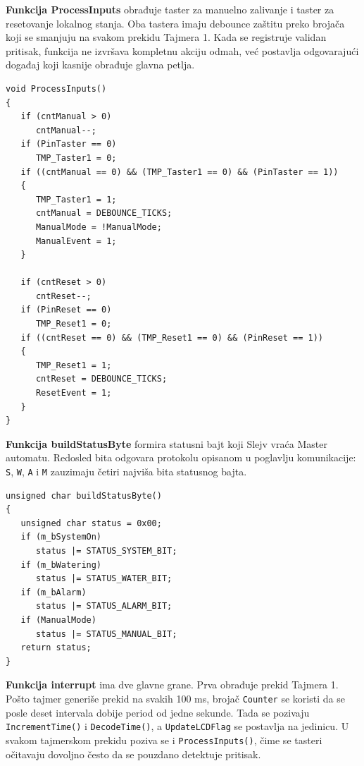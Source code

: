 \documentclass[12pt]{article}
\numberwithin{figure}{section}
\begin{document}
  \textbf{Funkcija ProcessInputs} obrađuje taster za manuelno zalivanje i taster za resetovanje lokalnog stanja.
  Oba tastera imaju debounce zaštitu preko brojača koji se smanjuju na svakom prekidu Tajmera 1.
  Kada se registruje validan pritisak, funkcija ne izvršava kompletnu akciju odmah, već postavlja odgovarajući događaj koji kasnije obrađuje glavna petlja.
  \begin{verbatim}
void ProcessInputs()
{
   if (cntManual > 0)
      cntManual--;
   if (PinTaster == 0)
      TMP_Taster1 = 0;
   if ((cntManual == 0) && (TMP_Taster1 == 0) && (PinTaster == 1))
   {
      TMP_Taster1 = 1;
      cntManual = DEBOUNCE_TICKS;
      ManualMode = !ManualMode;
      ManualEvent = 1;
   }

   if (cntReset > 0)
      cntReset--;
   if (PinReset == 0)
      TMP_Reset1 = 0;
   if ((cntReset == 0) && (TMP_Reset1 == 0) && (PinReset == 1))
   {
      TMP_Reset1 = 1;
      cntReset = DEBOUNCE_TICKS;
      ResetEvent = 1;
   }
}
  \end{verbatim}

  \textbf{Funkcija buildStatusByte} formira statusni bajt koji Slejv vraća Master automatu.
  Redosled bita odgovara protokolu opisanom u poglavlju komunikacije: \texttt{S}, \texttt{W}, \texttt{A} i \texttt{M} zauzimaju četiri najviša bita statusnog bajta.
  \begin{verbatim}
unsigned char buildStatusByte()
{
   unsigned char status = 0x00;
   if (m_bSystemOn)
      status |= STATUS_SYSTEM_BIT;
   if (m_bWatering)
      status |= STATUS_WATER_BIT;
   if (m_bAlarm)
      status |= STATUS_ALARM_BIT;
   if (ManualMode)
      status |= STATUS_MANUAL_BIT;
   return status;
}
  \end{verbatim}

  \textbf{Funkcija interrupt} ima dve glavne grane.
  Prva obrađuje prekid Tajmera 1.
  Pošto tajmer generiše prekid na svakih 100 ms, brojač \texttt{Counter} se koristi da se posle deset intervala dobije period od jedne sekunde. 
  Tada se pozivaju \texttt{IncrementTime()} i \texttt{DecodeTime()}, a \texttt{UpdateLCDFlag} se postavlja na jedinicu. 
  U svakom tajmerskom prekidu poziva se i \texttt{ProcessInputs()}, čime se tasteri očitavaju dovoljno često da se pouzdano detektuje pritisak.
\end{document}

